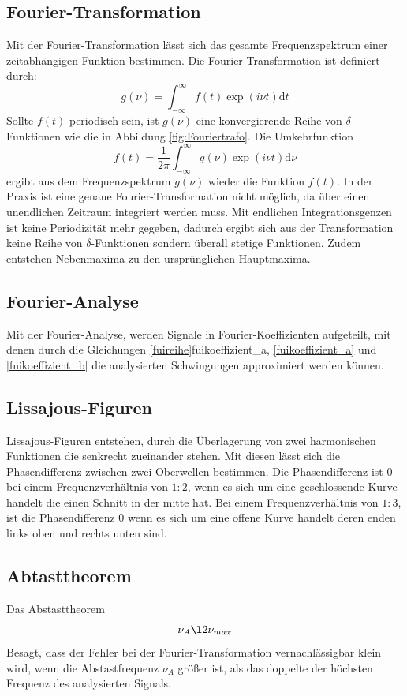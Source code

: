\subsection{Fourier-Transformation}
\label{sec:Fourier-Transformation}
Mit der Fourier-Transformation lässt sich das gesamte Frequenzspektrum einer
zeitabhängigen Funktion bestimmen. Die Fourier-Transformation ist definiert durch:
\begin{equation}
  g(\nu)= \int_{-\infty}^\infty f(t)\exp(i\nu t) \mathrm{d}t
\end{equation}
Sollte $f(t)$ periodisch sein, ist $g(\nu)$ eine konvergierende Reihe von
$\delta$-Funktionen wie die in Abbildung \ref{fig:Fouriertrafo}. Die Umkehrfunktion
\begin{equation}
  f(t)= \frac{1}{2\pi}\int_{-\infty}^\infty g(\nu)\exp(i\nu t) \mathrm{d}\nu
\end{equation}
ergibt aus dem Frequenzspektrum $g(\nu)$ wieder die Funktion $f(t)$. In der
Praxis ist eine genaue Fourier-Transformation nicht möglich, da über einen unendlichen
Zeitraum integriert werden muss. Mit endlichen Integrationsgenzen ist keine
Periodizität mehr gegeben, dadurch ergibt sich aus der Transformation keine Reihe
von $\delta$-Funktionen sondern überall stetige Funktionen. Zudem entstehen
Nebenmaxima zu den ursprünglichen Hauptmaxima.
\subsection{Fourier-Analyse}
\label{sec:Fourier-Analyse}
Mit der Fourier-Analyse, werden Signale in Fourier-Koeffizienten aufgeteilt, mit
denen durch die Gleichungen \eqref{fuireihe}{fuikoeffizient_a}, \eqref{fuikoeffizient_a}
und \eqref{fuikoeffizient_b} die analysierten Schwingungen approximiert werden können.
\subsection{Lissajous-Figuren}
Lissajous-Figuren entstehen, durch die Überlagerung von zwei harmonischen
Funktionen die senkrecht zueinander stehen. Mit diesen lässt sich die Phasendifferenz
zwischen zwei Oberwellen bestimmen.
Die Phasendifferenz ist $0$ bei einem Frequenzverhältnis von $1:2$, wenn es sich um
eine geschlossende Kurve handelt die einen Schnitt in der mitte hat.
Bei einem Frequenzverhältnis von $1:3$, ist die Phasendifferenz $0$ wenn es sich
um eine offene Kurve handelt deren enden links oben und rechts unten sind.
\subsection{Abtasttheorem}
Das Abstasttheorem
\begin{equation}
  \nu_A\l2\nu_{max}
\end{equation}
Besagt, dass der Fehler bei der Fourier-Transformation vernachlässigbar klein wird,
wenn die Abstastfrequenz $\nu_A$ größer ist, als das doppelte der höchsten Frequenz
des analysierten Signals.
\cite{sample}
